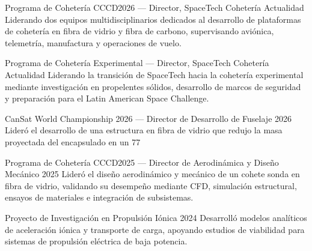 \cvsection{\ProjectsLabel}

\cvproject
{Programa de Cohetería CCCD2026 --- Director, SpaceTech Cohetería}
{Actualidad}
{
Liderando dos equipos multidisciplinarios dedicados al desarrollo de plataformas de cohetería en fibra de vidrio y fibra de carbono, supervisando aviónica, telemetría, manufactura y operaciones de vuelo.
}

\cvproject
{Programa de Cohetería Experimental --- Director, SpaceTech Cohetería}
{Actualidad}
{
Liderando la transición de SpaceTech hacia la cohetería experimental mediante investigación en propelentes sólidos, desarrollo de marcos de seguridad y preparación para el Latin American Space Challenge.
}

\cvproject
{CanSat World Championship 2026 --- Director de Desarrollo de Fuselaje}
{2026}
{
Lideró el desarrollo de una estructura en fibra de vidrio que redujo la masa proyectada del encapsulado en un 77%
}

\cvproject
{Programa de Cohetería CCCD2025 --- Director de Aerodinámica y Diseño Mecánico}
{2025}
{
Lideró el diseño aerodinámico y mecánico de un cohete sonda en fibra de vidrio, validando su desempeño mediante CFD, simulación estructural, ensayos de materiales e integración de subsistemas.
}

\cvproject
{Proyecto de Investigación en Propulsión Iónica}
{2024}
{
Desarrolló modelos analíticos de aceleración iónica y transporte de carga, apoyando estudios de viabilidad para sistemas de propulsión eléctrica de baja potencia.
}
